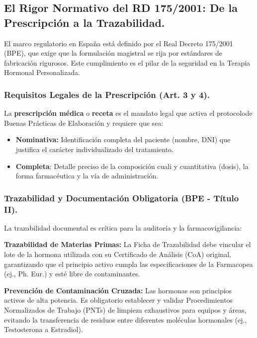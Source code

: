 \documentclass[
  spanish,
]{article}
\begin{document}
\subsection{El Rigor Normativo del RD 175/2001: De la Prescripción a la Trazabilidad.}\label{el-rigor-normativo-del-rd-1752001-de-la-prescripciuxf3n-a-la-trazabilidad.}

El marco regulatorio en España está definido por el Real Decreto 175/2001 (BPE), que exige que la formulación magistral se rija por estándares de fabricación rigurosos. Este cumplimiento es el pilar de la seguridad en la Terapia Hormonal Personalizada.

\subsubsection{Requisitos Legales de la Prescripción (Art. 3 y 4).}\label{requisitos-legales-de-la-prescripciuxf3n-art.-3-y-4.}

La \textbf{prescripción médica} o \textbf{receta} es el mandato legal que activa el protocolode Buenas Prácticas de Elaboración y requiere que sea:

\begin{itemize}
\item
  \textbf{Nominativa:} Identificación completa del paciente (nombre, DNI) que justifica el carácter individualizado del tratamiento.
\item
  \textbf{Completa}: Detalle preciso de la composición cuali y cuantitativa (dosis), la forma farmacéutica y la vía de administración.
\end{itemize}

\subsubsection{Trazabilidad y Documentación Obligatoria (BPE - Título II).}\label{trazabilidad-y-documentaciuxf3n-obligatoria-bpe---tuxedtulo-ii.}

La trazabilidad documental es crítica para la auditoría y la farmacovigilancia:

\textbf{Trazabilidad de Materias Primas:} La Ficha de Trazabilidad debe vincular el lote de la hormona utilizada con su Certificado de Análisis (CoA) original, garantizando que el principio activo cumpla las especificaciones de la Farmacopea (ej., Ph. Eur.) y esté libre de contaminantes.

\textbf{Prevención de Contaminación Cruzada:} Las hormonas son principios activos de alta potencia. Es obligatorio establecer y validar Procedimientos Normalizados de Trabajo (PNTs) de limpieza exhaustivos para equipos y áreas, evitando la transferencia de residuos entre diferentes moléculas hormonales (ej., Testosterona a Estradiol).
\end{document}
